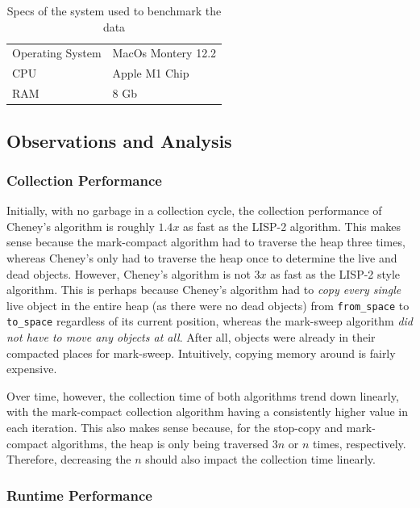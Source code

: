 \documentclass[index]{subfiles}
\begin{document}
\begin{table}
    \centering
    \begin{tabular}{@{}ll@{}} \toprule
        Operating System & MacOs Montery 12.2 \\
        CPU              & Apple M1 Chip      \\
        RAM              & 8 Gb               \\
        \bottomrule
    \end{tabular}
    \caption{Specs of the system used to benchmark the data}
\end{table}

\subsection{Observations and Analysis}

\subsubsection{Collection Performance}

Initially, with no garbage in a collection cycle, the collection performance of Cheney's algorithm is roughly \(1.4x\) as fast as the LISP-2 algorithm. This makes sense because the mark-compact algorithm had to traverse the heap three times, whereas Cheney's only had to traverse the heap once to determine the live and dead objects. However, Cheney's algorithm is not \(3x\) as fast as the LISP-2 style algorithm. This is perhaps because Cheney's algorithm had to \textit{copy every single} live object in the entire heap (as there were no dead objects) from \verb+from_space+ to \verb+to_space+ regardless of its current position, whereas the mark-sweep algorithm \textit{did not have to move any objects at all}. After all, objects were already in their compacted places for mark-sweep. Intuitively, copying memory around is fairly expensive.

Over time, however, the collection time of both algorithms trend down linearly, with the mark-compact collection algorithm having a consistently higher value in each iteration. This also makes sense because, for the stop-copy and mark-compact algorithms, the heap is only being traversed \(3n\) or \(n\) times, respectively. Therefore, decreasing the \(n\) should also impact the collection time linearly.

\subsubsection{Runtime Performance}
\end{document}
